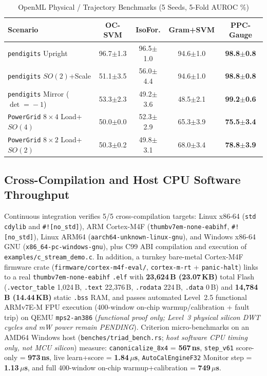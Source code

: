 \documentclass[conference]{IEEEtran}
\begin{document}
\begin{table}[t]
\centering
\caption{OpenML Physical / Trajectory Benchmarks (5 Seeds, 5-Fold AUROC \%)}
\label{tab:openml}
\begin{tabular}{@{}lcccc@{}}
\toprule
\textbf{Scenario} & \textbf{OC-SVM} & \textbf{IsoFor.} & \textbf{Gram+SVM} & \textbf{PPC-Gauge} \\
\midrule
\texttt{pendigits} Upright & 96.7$\pm$1.3 & 96.5$\pm$1.0 & 94.6$\pm$1.0 & \textbf{98.8$\pm$0.8} \\
\texttt{pendigits} $SO(2)$+Scale & 51.1$\pm$3.5 & 56.0$\pm$4.4 & 94.6$\pm$1.0 & \textbf{98.8$\pm$0.8} \\
\texttt{pendigits} Mirror ($\det\!=\!-1$) & 53.3$\pm$2.3 & 49.2$\pm$3.6 & 48.5$\pm$2.1 & \textbf{99.2$\pm$0.6} \\
\texttt{PowerGrid} $8\!\times\!4$ Load+$SO(4)$ & 50.0$\pm$0.0 & 52.3$\pm$2.9 & 65.3$\pm$3.9 & \textbf{75.5$\pm$3.4} \\
\texttt{PowerGrid} $8\!\times\!2$ Load+$SO(2)$ & 50.3$\pm$0.2 & 49.8$\pm$3.1 & 68.0$\pm$3.4 & \textbf{78.8$\pm$3.9} \\
\bottomrule
\end{tabular}
\end{table}

\subsection{Cross-Compilation and Host CPU Software Throughput}
Continuous integration verifies 5/5 cross-compilation targets: Linux x86-64 (\texttt{std} \texttt{cdylib} and \texttt{\#![no\_std]}), ARM Cortex-M4F (\texttt{thumbv7em-none-eabihf}, \texttt{\#![no\_std]}), Linux ARM64 (\texttt{aarch64-unknown-linux-gnu}), and Windows x86-64 GNU (\texttt{x86\_64-pc-windows-gnu}), plus C99 ABI compilation and execution of \texttt{examples/c\_stream\_demo.c}. In addition, a turnkey bare-metal Cortex-M4F firmware crate (\texttt{firmware/cortex-m4f-eval/}, \texttt{cortex-m-rt} + \texttt{panic-halt}) links to a real \texttt{thumbv7em-none-eabihf} \texttt{.elf} with \textbf{23,624\,B (23.07\,KB)} total Flash (\texttt{.vector\_table} 1,024\,B, \texttt{.text} 22,376\,B, \texttt{.rodata} 224\,B, \texttt{.data} 0\,B) and \textbf{14,784\,B (14.44\,KB)} static \texttt{.bss} RAM, and passes automated Level~2.5 functional ARMv7E-M FPU execution (400-window on-chip warmup/calibration + fault trip) on QEMU \texttt{mps2-an386} (\emph{functional proof only; Level~3 physical silicon DWT cycles and mW power remain PENDING}). Criterion micro-benchmarks on an AMD64 Windows host (\texttt{benches/triad\_bench.rs}; \emph{host software CPU timing only, not MCU silicon}) measure: \texttt{canonicalize\_8x4} = \textbf{567\,ns}, \texttt{step\_v61} score-only = \textbf{973\,ns}, live learn+score = \textbf{1.84\,$\mu$s}, \texttt{AutoCalEngineF32} Monitor step = \textbf{1.13\,$\mu$s}, and full 400-window on-chip warmup+calibration = \textbf{749\,$\mu$s}.
\end{document}
